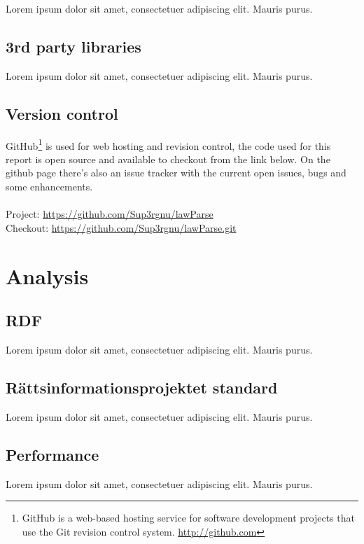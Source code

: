 \documentclass[a4paper,11pt]{kth-mag}
\begin{document}
Lorem ipsum dolor sit amet, consectetuer adipiscing elit. Mauris
purus. 

\section{3rd party libraries}

Lorem ipsum dolor sit amet, consectetuer adipiscing elit. Mauris
purus. 

\section{Version control}

GitHub\footnote{GitHub is a web-based hosting service for software development
projects that use the Git revision control system. \url{http://github.com}} is
used for web hosting and revision control, the code used for this report is
open source and available to checkout from the link below. On the github page
there's also an issue tracker with the current open issues, bugs and some
enhancements.\\\\
Project: \url{https://github.com/Sup3rgnu/lawParse}\\
Checkout: \url{https://github.com/Sup3rgnu/lawParse.git}

\chapter{Analysis}

\section{RDF}

Lorem ipsum dolor sit amet, consectetuer adipiscing elit. Mauris
purus.

\section{Rättsinformationsprojektet standard}

Lorem ipsum dolor sit amet, consectetuer adipiscing elit. Mauris
purus.  

\section{Performance}

Lorem ipsum dolor sit amet, consectetuer adipiscing elit. Mauris
purus. 
\end{document}
